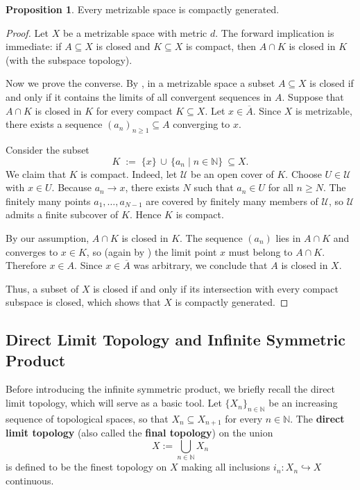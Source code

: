 \documentclass[10pt,a4paper]{article}
\theoremstyle{definition}
\newtheorem{proposition}[theorem]{Proposition}
\newcommand{\N}{\mathbb{N}}
\begin{document}
\begin{proposition}\label{prop:metrizable_is_compactly_generated}
    Every metrizable space is compactly generated.
\end{proposition}
\begin{proof}
Let $X$ be a metrizable space with metric $d$. 
The forward implication is immediate: if $A\subseteq X$ is closed and 
$K\subseteq X$ is compact, then $A\cap K$ is closed in $K$ (with the subspace topology).

Now we prove the converse. By \cite[Lemma~21.2]{Munkres2000Topology}, in a
metrizable space a subset $A\subseteq X$ is closed if and only if it contains the limits
of all convergent sequences in $A$. Suppose that $A\cap K$ is closed in $K$
for every compact $K\subseteq X$. Let $x\in\overline{A}$.
Since $X$ is metrizable, there exists a sequence $(a_n)_{n\ge1}\subseteq A$
converging to $x$.

Consider the subset
\[
K \;:=\; \{x\}\,\cup\,\{a_n \mid n\in\mathbb{N}\}\ \subseteq X.
\]
We claim that $K$ is compact. Indeed, let $\mathcal{U}$ be an open cover of
$K$. Choose $U\in\mathcal{U}$ with $x\in U$. Because $a_n\to x$, there exists
$N$ such that $a_n\in U$ for all $n\ge N$. The finitely many points
$a_1,\dots,a_{N-1}$ are covered by finitely many members of $\mathcal{U}$, so
$\mathcal{U}$ admits a finite subcover of $K$. Hence $K$ is compact.

By our assumption, $A\cap K$ is closed in $K$. The sequence $(a_n)$ lies in
$A\cap K$ and converges to $x\in K$, so (again by
\cite[Lemma~21.2]{Munkres2000Topology}) the limit point $x$ must belong to
$A\cap K$. Therefore $x\in A$. Since $x\in\overline{A}$ was arbitrary, we
conclude that $A$ is closed in $X$.

Thus, a subset of $X$ is closed if and only if its intersection with every compact
subspace is closed, which shows that $X$ is compactly generated.

\end{proof}

\subsection{Direct Limit Topology and Infinite Symmetric Product}

Before introducing the infinite symmetric product, we briefly recall the
direct limit topology, which will serve as a basic tool.
Let $\{X_{n}\}_{n \in \N}$ be an increasing sequence of topological spaces,
so that $X_{n} \subseteq X_{n+1}$ for every $n \in \N$.
The \textbf{direct limit topology} (also called the \textbf{final topology})
on the union
\[
X := \bigcup_{n \in \N} X_{n}
\]
is defined to be the finest topology on $X$ making all inclusions
$i_{n} \colon X_{n} \hookrightarrow X$ continuous.
\end{document}
